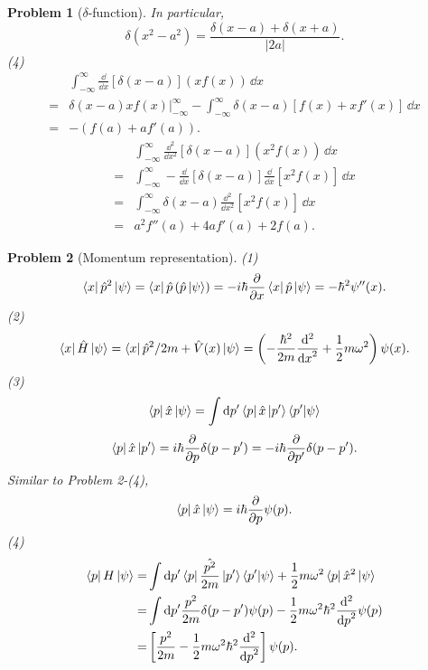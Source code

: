 \documentclass{article}
\theoremstyle{1}
\newtheorem{problem}{Problem}
\newcommand{\pa}{\partial}
\begin{document}
\begin{problem}[$\delta$-function]
    In particular, 
    \begin{equation}
        \boxed{\delta(x^2-a^2)=\frac{\delta(x-a)+\delta(x+a)}{\left|2a\right|}.}
    \end{equation}
    (4) \begin{align}
        &\int_{-\infty}^{\infty}\frac{\dd}{\dd{x}}\left[\delta(x-a)\right]\left(x f(x)\right)\, \dd{x}\\
        =&\left.\delta(x-a)xf(x)\right|_{-\infty}^{\infty}-\int_{-\infty}^{\infty}\delta(x-a)\left[f(x)+xf'(x)\right]\, \dd{x}\\
        =&-\left(f(a)+af'(a)\right).
    \end{align}
    \begin{align}
        &\int_{-\infty}^{\infty}\frac{\dd^2}{\dd{x}^2}\left[\delta(x-a)\right]\left(x^2 f(x)\right)\, \dd{x}\\
        =&\int_{-\infty}^{\infty}-\frac{\dd}{\dd{x}}\left[\delta(x-a)\right]\frac{\dd}{\dd{x}}\left[x^2 f(x)\right]\, \dd{x}\\
        =&\int_{-\infty}^{\infty}\delta(x-a)\frac{\dd^2}{\dd{x}^2}\left[x^2 f(x)\right]\, \dd{x}\\
        =&a^2f''(a)+4af'(a)+2f(a).
    \end{align}
\end{problem}
\begin{problem}[Momentum representation]
    (1)\begin{equation}
        \bra{x}\hat{p}^2\ket{\psi}=\bra{x}\hat{p}\left(\hat{p}\ket{\psi}\right)=-i\hbar\frac{\pa}{\pa x}\bra{x}\hat{p}\ket{\psi}=-\hbar^2\psi''(x).
    \end{equation}
    (2) \begin{equation}
        \bra{x}\hat{H}\ket{\psi}=\bra{x}\hat{p}^2/2m+\hat{V}(x)\ket{\psi}=\left(-\frac{\hbar^2}{2m}\frac{\dd^2}{\dd{x}^2}+\frac{1}{2}m\omega^2\right)\psi(x).
    \end{equation}
    (3) \begin{equation}
        \bra{p}\hat{x}\ket{\psi}=\int\dd{p'}\bra{p}\hat{x}\ket{p'}\braket{p'}{\psi}
    \end{equation}
    \begin{equation}
        \bra{p}\hat{x}\ket{p'}=i\hbar\frac{\pa}{\pa p}\delta(p-p')=-i\hbar\frac{\pa}{\pa p'}\delta(p-p').
    \end{equation}
    Similar to Problem 2-(4),
    \begin{equation}
        \bra{p}\hat{x}\ket{\psi}=i\hbar\frac{\pa}{\pa p}\psi(p).
    \end{equation}
    (4) \begin{align}
        \bra{p}H\ket{\psi}=&\int\dd{p'}\bra{p}\frac{\hat{p^2}}{2m}\ket{p'}\bra{p'}\ket{\psi}+\frac{1}{2}m\omega^2\bra{p}\hat{x}^2\ket{\psi}\notag\\
        =&\int{\dd{p'}}\frac{p^2}{2m}\delta(p-p')\psi(p)-\frac{1}{2}m\omega^2\hbar^2\frac{\dd^2}{\dd{p}^2}\psi(p)\notag\\
        =&\left[\frac{p^2}{2m}-\frac{1}{2}m\omega^2\hbar^2\frac{\dd^2}{\dd{p}^2}\right]\psi(p).
    \end{align}
\end{problem}
\end{document}
